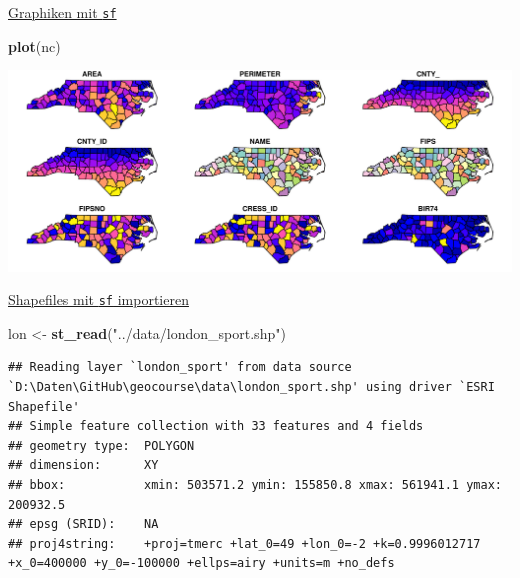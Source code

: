 \documentclass[ignorenonframetext,]{beamer}
\newenvironment{Shaded}{\begin{snugshade}}{\end{snugshade}}
\newcommand{\KeywordTok}[1]{\textcolor[rgb]{0.13,0.29,0.53}{\textbf{#1}}}
\newcommand{\StringTok}[1]{\textcolor[rgb]{0.31,0.60,0.02}{#1}}
\newcommand{\NormalTok}[1]{#1}
\begin{document}
\begin{frame}[fragile]{\href{https://r-spatial.github.io/sf/articles/sf5.html}{Graphiken
mit \texttt{sf}}}

\begin{Shaded}
\begin{Highlighting}[]
\KeywordTok{plot}\NormalTok{(nc)}
\end{Highlighting}
\end{Shaded}

\includegraphics{simplefeatures_files/figure-beamer/unnamed-chunk-12-1.pdf}

\end{frame}

\begin{frame}[fragile]{\href{https://cran.r-project.org/web/packages/sf/vignettes/sf2.html}{Shapefiles
mit \texttt{sf} importieren}}

\begin{Shaded}
\begin{Highlighting}[]
\NormalTok{lon <-}\StringTok{ }\KeywordTok{st_read}\NormalTok{(}\StringTok{"../data/london_sport.shp"}\NormalTok{)}
\end{Highlighting}
\end{Shaded}

\begin{verbatim}
## Reading layer `london_sport' from data source `D:\Daten\GitHub\geocourse\data\london_sport.shp' using driver `ESRI Shapefile'
## Simple feature collection with 33 features and 4 fields
## geometry type:  POLYGON
## dimension:      XY
## bbox:           xmin: 503571.2 ymin: 155850.8 xmax: 561941.1 ymax: 200932.5
## epsg (SRID):    NA
## proj4string:    +proj=tmerc +lat_0=49 +lon_0=-2 +k=0.9996012717 +x_0=400000 +y_0=-100000 +ellps=airy +units=m +no_defs
\end{verbatim}

\end{frame}
\end{document}
